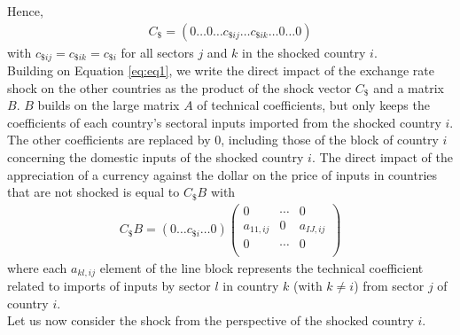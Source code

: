 \documentclass[11pt,a4paper]{article}
\begin{document}
Hence,
\begin{eqnarray*}
 C_\$=\left(0\ldots0\ldots c_{\$ij}\ldots c_{\$ik}\dots 0\ldots0\right)
\end{eqnarray*}
with $c_{\$ij}=c_{\$ik}=c_{\$i}
$
for all sectors $j$ and $k$ in the shocked country $i$.\\
Building on Equation \ref{eq:eq1}, we write the direct impact of the exchange rate shock on the other countries as the product of the shock vector $C_{\$}$ and a matrix $B$. $B$ builds on the large matrix $A$ of technical coefficients, but only keeps the coefficients of each country's sectoral inputs imported from the shocked country $i$. The other coefficients are replaced by 0, including those of the block of country $i$ concerning the domestic inputs of the shocked country $i$. The direct impact of the appreciation of a currency against the dollar on the price of inputs in countries that are not shocked is equal to $C_{\$}B$ with
\begin{eqnarray}
{C_{\$}}B=\left(0\ldots c_{\$i}\ldots 0\right)\left(\begin{matrix}0&\cdots&0\\a_{11,ij}&0&a_{IJ,ij}\\0&\cdots&0\\\end{matrix}\right) 	
\label{eq:eq3}
\end{eqnarray}
where each $a_{kl,ij}$ element of the line block represents the technical coefficient related to imports of inputs by sector $l$ in country $k$ (with $k\ne i$) from sector $j$ of country $i$.\\
Let us now consider the shock from the perspective of the shocked country $i$.\\
\\
\end{document}
